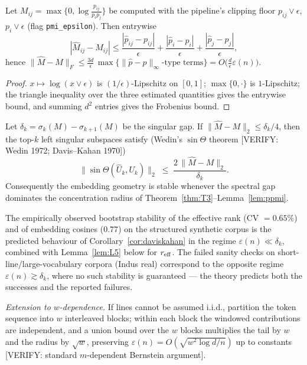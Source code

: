 \begin{lemma}
\label{lem:ppmi}
Let $M_{ij}=\max\{0,\log\frac{p_{ij}}{p_i p_j}\}$ be computed with the
pipeline's clipping floor $p_{ij}\vee\epsilon$, $p_i\vee\epsilon$
(flag \texttt{pmi\_epsilon}). Then entrywise
\[
|\hat M_{ij}-M_{ij}|
\le \frac{|\hat p_{ij}-p_{ij}|}{\epsilon}
+\frac{|\hat p_i-p_i|}{\epsilon}
+\frac{|\hat p_j-p_j|}{\epsilon},
\]
hence
$\|\hat M-M\|_F\le \frac{3d}{\epsilon}\,
\max\{\|\hat p-p\|_\infty\text{-type terms}\}
=O\!\bigl(\tfrac{d}{\epsilon}\varepsilon(n)\bigr)$.
\end{lemma}

\begin{proof}
$x\mapsto\log(x\vee\epsilon)$ is $(1/\epsilon)$-Lipschitz on
$[0,1]$; $\max\{0,\cdot\}$ is $1$-Lipschitz; the triangle inequality
over the three estimated quantities gives the entrywise bound, and
summing $d^2$ entries gives the Frobenius bound.
\end{proof}

\begin{corollary}
\label{cor:daviskahan}
Let $\delta_k=\sigma_k(M)-\sigma_{k+1}(M)$ be the singular gap. If
$\|\hat M-M\|_2\le\delta_k/4$, then the top-$k$ left singular
subspaces satisfy (Wedin's $\sin\Theta$ theorem [VERIFY: Wedin 1972;
Davis--Kahan 1970])
\[
\|\sin\Theta(\hat U_k,U_k)\|_2
\;\le\;\frac{2\,\|\hat M-M\|_2}{\delta_k}.
\]
Consequently the embedding geometry is stable whenever the spectral
gap dominates the concentration radius of
Theorem~\ref{thm:T3}--Lemma~\ref{lem:ppmi}.
\end{corollary}

\begin{remark}
The empirically observed bootstrap stability of the effective rank
(CV $=0.65\%$) and of embedding cosines ($0.77$) on the structured
synthetic corpus is the predicted behaviour of
Corollary~\ref{cor:daviskahan} in the regime
$\varepsilon(n)\ll\delta_k$, combined with
Lemma~\ref{lem:L5} below for $r_{\mathrm{eff}}$. The failed sanity checks on
short-line/large-vocabulary corpora (Indus real) correspond to the
opposite regime $\varepsilon(n)\gtrsim\delta_k$, where no such
stability is guaranteed --- the theory predicts both the successes and
the reported failures.
\end{remark}

\emph{Extension to $w$-dependence.} If lines cannot be assumed
i.i.d., partition the token sequence into $w$ interleaved blocks;
within each block the windowed contributions are independent, and a
union bound over the $w$ blocks multiplies the tail by $w$ and the
radius by $\sqrt{w}$, preserving
$\varepsilon(n)=O(\sqrt{w^{2}\log d/n})$ up to constants
[VERIFY: standard $m$-dependent Bernstein argument].

